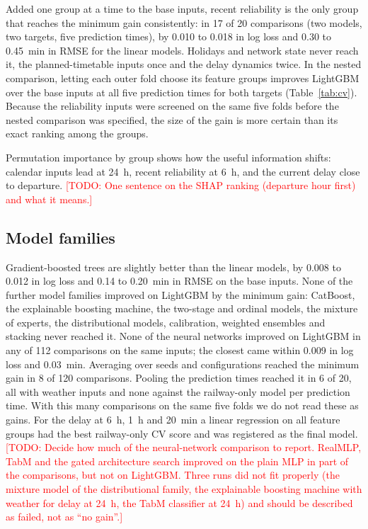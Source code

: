 \documentclass[conference]{IEEEtran}
\newcommand{\todo}[1]{\textcolor{red}{[TODO: #1]}}
\begin{document}
Added one group at a time to the base inputs, recent reliability is the only group that reaches the
minimum gain consistently: in 17 of 20 comparisons (two models, two targets, five prediction times),
by 0.010 to 0.018 in log loss and 0.30 to 0.45~min in RMSE for the linear models. Holidays and
network state never reach it, the planned-timetable inputs once and the delay dynamics twice. In the
nested comparison, letting each outer fold choose its feature groups improves LightGBM over the base
inputs at all five prediction times for both targets (Table~\ref{tab:cv}). Because the reliability
inputs were screened on the same five folds before the nested comparison was specified, the size of
the gain is more certain than its exact ranking among the groups.

Permutation importance by group shows how the useful information shifts: calendar inputs lead at
24~h, recent reliability at 6~h, and the current delay close to departure. \todo{One sentence on the
SHAP ranking (departure hour first) and what it means.}

\subsection{Model families}

Gradient-boosted trees are slightly better than the linear models, by 0.008 to 0.012 in log loss
and 0.14 to 0.20~min in RMSE on the base inputs. None of the further model families improved on
LightGBM by the minimum gain: CatBoost, the explainable boosting machine, the two-stage and ordinal
models, the mixture of experts, the distributional models, calibration, weighted ensembles and
stacking never reached it. None of the neural networks improved on LightGBM in any of 112
comparisons on the same inputs; the closest came within 0.009 in log loss and 0.03~min. Averaging
over seeds and configurations reached the minimum gain in 8 of 120 comparisons. Pooling the
prediction times reached it in 6 of 20, all with weather inputs and none against the railway-only
model per prediction time. With this many comparisons on the same five folds we do not read these
as gains. For the delay
at 6~h, 1~h and 20~min a linear regression on all feature groups had the best railway-only CV score
and was registered as the final model. \todo{Decide how much of the neural-network comparison to
report. RealMLP, TabM and the gated architecture search improved on the plain MLP in part of the
comparisons, but not on LightGBM. Three runs did not fit properly (the mixture model of the
distributional family, the explainable boosting machine with weather for delay at 24~h, the TabM
classifier at 24~h) and should be described as failed, not as ``no gain''.}
\end{document}
